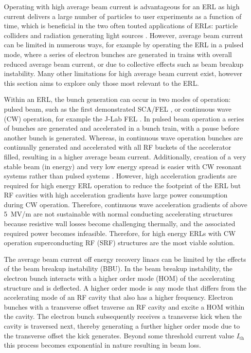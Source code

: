 \documentclass[../main.tex]{subfiles}
\begin{document}
Operating with high average beam current is advantageous for an ERL as high current delivers a large number of particles to user experiments as a function of time, which is beneficial in the two often touted applications of ERLs: particle colliders \cite{valloni2013strawman,bruning2019exploring,holzer2021accelerator} and radiation generating light sources \cite{neil2006jlab,priebe2010first}. However, average beam current can be limited in numerous ways, for example by operating the ERL in a pulsed mode, where a series of electron bunches are generated in trains with overall reduced average beam current, or due to collective effects such as beam breakup instability. Many other limitations for high average beam current exist, however this section aims to explore only those most relevant to the ERL.  

Within an ERL, the bunch generation can occur in two modes of operation: pulsed beam, such as the first demonstrated SCA/FEL \cite{smith1987development}, or continuous wave (CW) operation, for example the J-Lab FEL \cite{neil2006jlab}. In pulsed beam operation a series of bunches are generated and accelerated in a bunch train, with a pause before another bunch is generated. Whereas, in continuous wave operation bunches are continually generated and accelerated with all RF buckets of the accelerator filled, resulting in a higher average beam current. Additionally, creation of a very stable beam (in energy) and very low energy spread is easier with CW resonant systems rather than pulsed systems \cite{reece2016continuous}. However, high acceleration gradients are required for high energy ERL operation to reduce the footprint of the ERL but RF cavities with high acceleration gradients have large power consumption during CW operation. Therefore, continuous wave acceleration gradients of above 5~\si{\mega\volt}/\si{\meter} are not sustainable with normal conducting accelerating structures \cite{reece2016continuous} because resistive wall losses become challenging thermally, and the associated required power becomes infeasible. Therefore, for high energy ERLs with CW operation superconducting RF (SRF) structures are the most viable solution. 

The average beam current off energy recovery linacs can be limited by the effects of the beam breakup instability (BBU). In the beam breakup instability, the electron bunch interacts with a higher order mode (HOM) of the accelerating structure and is deflected. A higher order mode is any mode that differs from the accelerating mode of an RF cavity that also has a higher frequency. Electron bunches with a transverse offset traverse an RF cavity and excite a HOM within the cavity. The electron bunch subsequently receives a transverse kick when the cavity is traversed next, thereby generating a further higher order mode due to the transverse offset the kick generates. Beyond some threshold current value $I_{\mathrm{th}}$ this process becomes exponential in nature resulting in beam loss.
\end{document}
